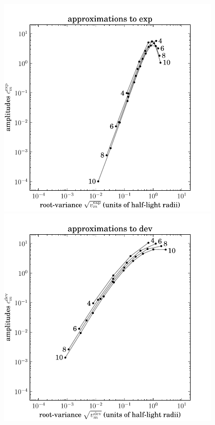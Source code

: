 \documentclass[12pt,pdftex,preprint]{aastex}
\newlength{\figurewidth}
\begin{document}
\clearpage
\begin{figure}
\includegraphics[width=\figurewidth]{mixtures_vs_K_exp.pdf}%
\includegraphics[width=\figurewidth]{mixtures_vs_K_dev.pdf}\\

\end{figure}
\end{document}
